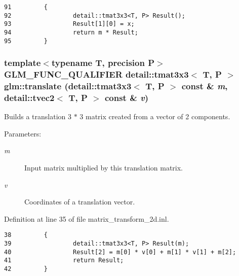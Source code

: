 \begin{Code}\begin{verbatim}91         {
92                 detail::tmat3x3<T, P> Result();
93                 Result[1][0] = x;
94                 return m * Result;
95         }
\end{verbatim}
\end{Code}


\hypertarget{group__gtx__matrix__transform__2d_g307934204fead7ff8ec86bd4499c0adc}{
\subsubsection[translate]{\setlength{\rightskip}{0pt plus 5cm}template$<$typename T, precision P$>$ GLM\_\-FUNC\_\-QUALIFIER detail::tmat3x3$<$ T, P $>$ glm::translate (detail::tmat3x3$<$ T, P $>$ const \& {\em m}, \/  detail::tvec2$<$ T, P $>$ const \& {\em v})}}
\label{group__gtx__matrix__transform__2d_g307934204fead7ff8ec86bd4499c0adc}


Builds a translation 3 $\ast$ 3 matrix created from a vector of 2 components.

\begin{Desc}
\item[Parameters:]
\begin{description}
\item[{\em m}]Input matrix multiplied by this translation matrix. \item[{\em v}]Coordinates of a translation vector. \end{description}
\end{Desc}


Definition at line 35 of file matrix\_\-transform\_\-2d.inl.

\begin{Code}\begin{verbatim}38         {
39                 detail::tmat3x3<T, P> Result(m);
40                 Result[2] = m[0] * v[0] + m[1] * v[1] + m[2];
41                 return Result;
42         }
\end{verbatim}
\end{Code}


